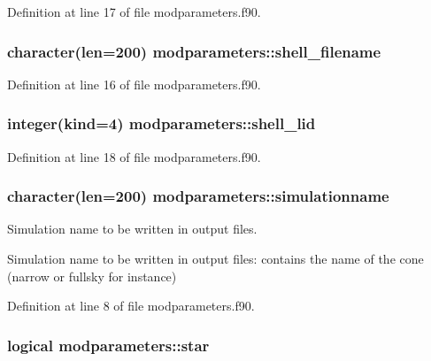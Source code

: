Definition at line 17 of file modparameters.\-f90.

\hypertarget{classmodparameters_a308c50059015f7278785da01f4a9f99b}{
\subsubsection[{shell\-\_\-filename}]{\setlength{\rightskip}{0pt plus 5cm}character(len=200) modparameters\-::shell\-\_\-filename}}\label{classmodparameters_a308c50059015f7278785da01f4a9f99b}


Definition at line 16 of file modparameters.\-f90.

\hypertarget{classmodparameters_a669111d8b0ac2247e89f14c8778d77d5}{
\subsubsection[{shell\-\_\-lid}]{\setlength{\rightskip}{0pt plus 5cm}integer(kind=4) modparameters\-::shell\-\_\-lid}}\label{classmodparameters_a669111d8b0ac2247e89f14c8778d77d5}


Definition at line 18 of file modparameters.\-f90.

\hypertarget{classmodparameters_a8e3087ed26ddd977f3b7214948ebf62b}{
\subsubsection[{simulationname}]{\setlength{\rightskip}{0pt plus 5cm}character(len=200) modparameters\-::simulationname}}\label{classmodparameters_a8e3087ed26ddd977f3b7214948ebf62b}


Simulation name to be written in output files. 

Simulation name to be written in output files\-: contains the name of the cone (narrow or fullsky for instance) 

Definition at line 8 of file modparameters.\-f90.

\hypertarget{classmodparameters_a5c425cedc8a349e31a559939e8887419}{
\subsubsection[{star}]{\setlength{\rightskip}{0pt plus 5cm}logical modparameters\-::star}}\label{classmodparameters_a5c425cedc8a349e31a559939e8887419}


